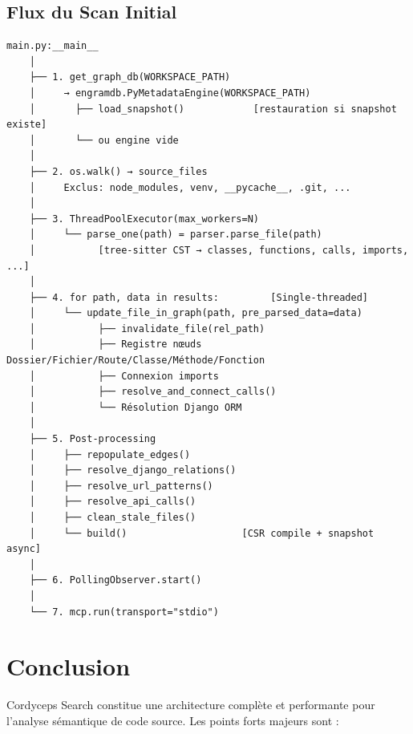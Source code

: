 \documentclass[12pt,a4paper]{article}
\begin{document}
\subsection{Flux du Scan Initial}

\begin{lstlisting}[basicstyle=\ttfamily\scriptsize]
main.py:__main__
    │
    ├── 1. get_graph_db(WORKSPACE_PATH)
    │     → engramdb.PyMetadataEngine(WORKSPACE_PATH)
    │       ├── load_snapshot()            [restauration si snapshot existe]
    │       └── ou engine vide
    │
    ├── 2. os.walk() → source_files
    │     Exclus: node_modules, venv, __pycache__, .git, ...
    │
    ├── 3. ThreadPoolExecutor(max_workers=N)
    │     └── parse_one(path) = parser.parse_file(path)
    │           [tree-sitter CST → classes, functions, calls, imports, ...]
    │
    ├── 4. for path, data in results:         [Single-threaded]
    │     └── update_file_in_graph(path, pre_parsed_data=data)
    │           ├── invalidate_file(rel_path)
    │           ├── Registre nœuds Dossier/Fichier/Route/Classe/Méthode/Fonction
    │           ├── Connexion imports
    │           ├── resolve_and_connect_calls()
    │           └── Résolution Django ORM
    │
    ├── 5. Post-processing
    │     ├── repopulate_edges()
    │     ├── resolve_django_relations()
    │     ├── resolve_url_patterns()
    │     ├── resolve_api_calls()
    │     ├── clean_stale_files()
    │     └── build()                    [CSR compile + snapshot async]
    │
    ├── 6. PollingObserver.start()
    │
    └── 7. mcp.run(transport="stdio")
\end{lstlisting}

\section{Conclusion}

Cordyceps Search constitue une architecture complète et performante pour l'analyse sémantique de code source. Les points forts majeurs sont :
\end{document}
